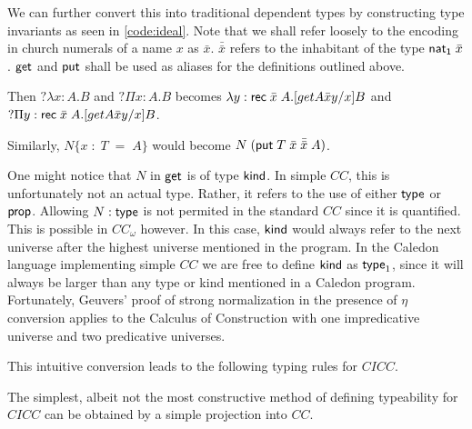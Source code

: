We can further convert this into traditional dependent types by constructing
 type invariants as seen in \ref{code:ideal}.   Note that we shall refer loosely 
to the encoding in church numerals of a name $x$ as $\bar{x}$.  $\bar{\bar{x}}$ refers to the 
inhabitant of the type $\mathsf{nat_1}\;\bar{x}$.   $\mathsf{get}$ and $\mathsf{put}$ shall be used as 
aliases for the definitions outlined above.

Then $?\lambda x : A . B$ and $?\Pi x : A . B$ 
becomes $\lambda y : \mathsf{rec}\;\bar{x}\;A . [get A \bar{x} y / x ] B$
and $?\Pi y : \mathsf{rec}\;\bar{x}\;A . [get A \bar{x} y / x ] B$.

Similarly, $N \{ x\; : \; T \; = \;A \} $
would become $N\;( \mathsf{put} \; T \; \bar{x} \; \bar{\bar{x}} \; A)$.

One might notice that $N$ in $\mathsf{get}$ is of type $\mathsf{kind}$.  
In simple $CC$, this is unfortunately not an actual type. 
Rather, it refers to the use of either $\mathsf{type}$ or $\mathsf{prop}$.  
Allowing $N : \mathsf{type}$ is not permited in the standard $CC$ since it is quantified.
This is possible in $CC_\omega$ however.
In this case, $\mathsf{kind}$ would always refer to the next universe after the highest
universe mentioned in the program.
In the Caledon language implementing simple $CC$ we are free to define 
$\mathsf{kind}$ as $\mathsf{type}_1$, since it will always be larger than any
type or kind mentioned in a Caledon program.  
Fortunately, Geuvers' proof \citep{geuvers1993logics} of strong normalization in the presence of 
$\eta$ conversion applies to the Calculus of Construction with one impredicative universe and two predicative
universes.

This intuitive conversion leads to the following typing rules for $CICC$.


The simplest, albeit not the most constructive method of defining typeability for $CICC$ can be obtained by a simple projection into $CC$.

\newcommand{\CICCproj}[1]{ \left\llbracket #1 \right\rrbracket_{ci}}


